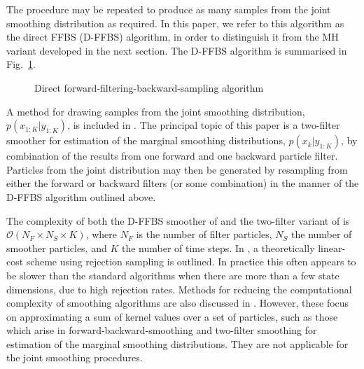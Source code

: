 \documentclass[10pt,twocolumn,twoside]{IEEEtran}
\begin{document}
The procedure may be repeated to produce as many samples from the joint smoothing distribution as required. In this paper, we refer to this algorithm as the direct FFBS (D-FFBS) algorithm, in order to distinguish it from the MH variant developed in the next section. The D-FFBS algorithm is summarised in Fig.~\ref{alg:DBRS}.

\begin{figure}
\caption{Direct forward-filtering-backward-sampling algorithm}
\label{alg:DBRS}
\end{figure}

A method for drawing samples from the joint smoothing distribution, $p(x_{1:K}|y_{1:K})$, is included in \cite{Briers2010}. The principal topic of this paper is a two-filter smoother for estimation of the marginal smoothing distributions, $p(x_{k}|y_{1:K})$, by combination of the results from one forward and one backward particle filter. Particles from the joint distribution may then be generated by resampling from either the forward or backward filters (or some combination) in the manner of the D-FFBS algorithm outlined above.

The complexity of both the D-FFBS smoother of \cite{Godsill2004} and the two-filter variant of \cite{Briers2010} is $\mathcal{O}(N_F \times N_S \times K)$, where $N_F$ is the number of filter particles, $N_S$ the number of smoother particles, and $K$ the number of time steps. In \cite{Douc2009}, a theoretically linear-cost scheme using rejection sampling is outlined. In practice this often appears to be slower than the standard algorithms when there are more than a few state dimensions, due to high rejection rates. Methods for reducing the computational complexity of smoothing algorithms are also discussed in \cite{Klaas2006}. However, these focus on approximating a sum of kernel values over a set of particles, such as those which arise in forward-backward-smoothing \cite{Doucet2000a} and two-filter smoothing \cite{Briers2010} for estimation of the marginal smoothing distributions. They are not applicable for the joint smoothing procedures.
\end{document}
